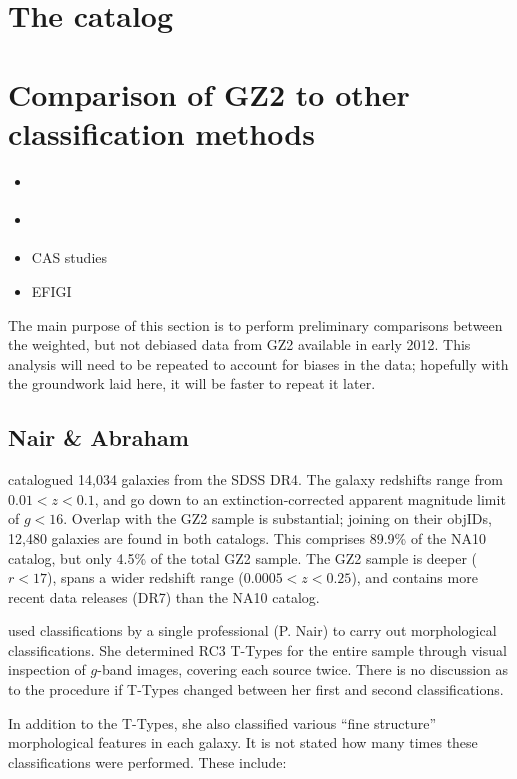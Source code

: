 \documentclass[useAMS,usenatbib]{mn2e}
\begin{document}
\section{The catalog} \label{sec-catalog}

\section{Comparison of GZ2 to other classification methods}\label{sec-comparison}

\begin{itemize}
	\item \citet{nai10}
	\item \citet{hue11}
	\item CAS studies \citep{con03,con06} 
	\item EFIGI \citep{bai11}
\end{itemize}

The main purpose of this section is to perform preliminary comparisons between the weighted, but not debiased data from GZ2 available in early 2012. This analysis will need to be repeated to account for biases in the data; hopefully with the groundwork laid here, it will be faster to repeat it later.  

\subsection{Nair \& Abraham}

\citet[][; hereafter NA10]{nai10} catalogued 14,034 galaxies from the SDSS DR4. The galaxy redshifts range from $0.01<z<0.1$, and go down to an extinction-corrected apparent magnitude limit of $g<16$. Overlap with the GZ2 sample is substantial; joining on their objIDs, 12,480 galaxies are found in both catalogs. This comprises 89.9\% of the NA10 catalog, but only 4.5\% of the total GZ2 sample. The GZ2 sample is deeper ($r<17$), spans a wider redshift range ($0.0005<z<0.25$), and contains more recent data releases (DR7) than the NA10 catalog. 

\citet{nai10} used classifications by a single professional (P. Nair) to carry out morphological classifications. She determined RC3 T-Types for the entire sample through visual inspection of $g$-band images, covering each source twice. There is no discussion as to the procedure if T-Types changed between her first and second classifications. 

In addition to the T-Types, she also classified various ``fine structure'' morphological features in each galaxy. It is not stated how many times these classifications were performed. These include:
\end{document}
